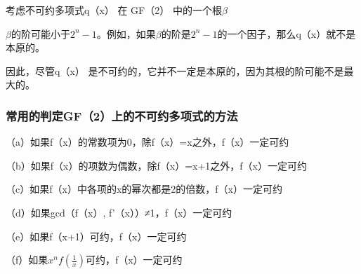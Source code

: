 \documentclass[a4paper,11pt,UTF8]{ctexart}
\begin{document}
      考虑不可约多项式q（x） 在 GF（2） 中的一个根$ \beta $\par
      $ \beta $的阶可能小于$2^{n}-1$。例如，如果$ \beta $的阶是$2^{n}-1$的一个因子，那么q（x）就不是本原的。\par
      因此，尽管q（x） 是不可约的，它并不一定是本原的，因为其根的阶可能不是最大的。

    \subsubsection{常用的判定GF（2）上的不可约多项式的方法}
      （a）如果f（x）的常数项为0，除f（x）=x之外，f（x）一定可约\par
      （b）如果f（x）的项数为偶数，除f（x）=x+1之外，f（x）一定可约\par
      （c）如果f（x）中各项的x的幂次都是2的倍数，f（x）一定可约\par
      （d）如果gcd（f（x）, f’（x））≠1，f（x）一定可约\par
      （e）如果f（x+1）可约，f（x）一定可约\par
      （f）如果$ x^{n}f(\frac{1}{x} )$可约，f（x）一定可约\par

      
\end{document}
